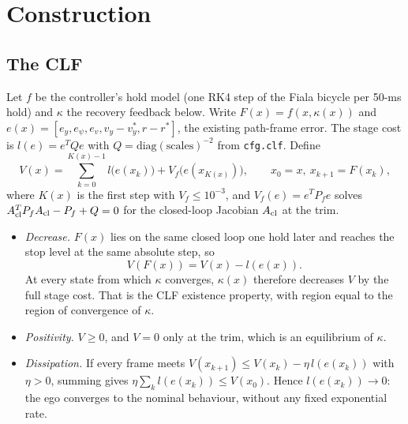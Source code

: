 \documentclass[11pt]{article}
\begin{document}
\section{Construction}
\subsection{The CLF}
Let $f$ be the controller's hold model (one RK4 step of the Fiala bicycle per
50-ms hold) and $\kappa$ the recovery feedback below. Write
$F(x)=f(x,\kappa(x))$ and $e(x)=[e_y,e_\psi,e_v,v_y-v_y^*,r-r^*]$, the
existing path-frame error. The stage cost is $l(e)=e^TQe$ with
$Q=\mathrm{diag}(\mathrm{scales})^{-2}$ from \texttt{cfg.clf}. Define
\[
V(x)=\sum_{k=0}^{K(x)-1}l\bigl(e(x_k)\bigr)+V_f\bigl(e(x_{K(x)})\bigr),\qquad x_0=x,\ x_{k+1}=F(x_k),
\]
where $K(x)$ is the first step with $V_f\le10^{-3}$, and
$V_f(e)=e^TP_fe$ solves $A_{\rm cl}^TP_fA_{\rm cl}-P_f+Q=0$ for the closed-loop
Jacobian $A_{\rm cl}$ at the trim.
\begin{itemize}
\item \emph{Decrease.} $F(x)$ lies on the same closed loop one hold later and
reaches the stop level at the same absolute step, so
\[
V(F(x))=V(x)-l(e(x)).
\]
At every state from which $\kappa$ converges, $\kappa(x)$ therefore decreases
$V$ by the full stage cost. That is the CLF existence property, with region
equal to the region of convergence of $\kappa$.
\item \emph{Positivity.} $V\ge0$, and $V=0$ only at the trim, which is an
equilibrium of $\kappa$.
\item \emph{Dissipation.} If every frame meets
$V(x_{k+1})\le V(x_k)-\eta\,l(e(x_k))$ with $\eta>0$, summing gives
$\eta\sum_k l(e(x_k))\le V(x_0)$. Hence $l(e(x_k))\to0$: the ego converges to
the nominal behaviour, without any fixed exponential rate.
\end{itemize}
\end{document}
